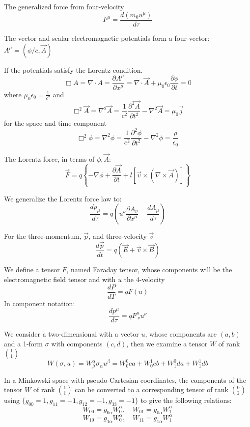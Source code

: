 \documentclass{article}
\begin{document}
    \subsection*{}
    The generalized force from four-velocity
    $$ F^\mu = \frac{d(m_0 u^\mu)}{d\tau} $$
    
    The vector and scalar electromagnetic potentials form a four-vector: $A^\mu = (\phi/c, \vec{A})$
    
    If the potentials satisfy the Lorentz condition.
    $$ \Box A = \nabla \cdot A = \frac{\partial A^\mu}{\partial x^\mu} = \nabla \cdot \vec{A} + \mu_0 \epsilon_0 \frac{\partial \phi}{\partial t} = 0 $$
    where $\mu_0 \epsilon_0 = \frac{1}{c^2}$ and
    $$ \Box^2 \vec{A} = \nabla^2 \vec{A} = \frac{1}{c^2} \frac{\partial^2 \vec{A}}{\partial t^2} - \nabla^2 \vec{A} = \mu_0 \vec{j} $$
    for the space and time component
    $$ \Box^2 \phi = \nabla^2 \phi = \frac{1}{c^2} \frac{\partial^2 \phi}{\partial t^2} - \nabla^2 \phi = \frac{\rho}{\epsilon_0} $$
    
    The Lorentz force, in terms of $\phi, \vec{A}$:
    $$ \vec{F} = q \left\{ -\nabla \phi + \frac{\partial \vec{A}}{\partial t} + l \left[ \vec{v} \times (\nabla \times \vec{A}) \right] \right\} $$
    
    We generalize the Lorentz force law to:
    $$ \frac{dp_\mu}{d\tau} = q \left( u^\nu \frac{\partial A_\nu}{\partial x^\mu} - \frac{dA_\mu}{d\tau} \right) $$
    
    For the three-momentum, $\vec{p}$, and three-velocity $\vec{v}$
    $$ \frac{d\vec{p}}{dt} = q(\vec{E} + \vec{v} \times \vec{B}) $$
    
    We define a tensor $F$, named Faraday tensor, whose components will be the electromagnetic field tensor and with $u$ the 4-velocity
    $$ \frac{dP}{dT} = q F(u) $$
    In component notation:
    $$ \frac{dp^\mu}{d\tau} = q F^\mu_{\ \nu} u^\nu $$
    
    We consider a two-dimensional with a vector $u$, whose components are $(a,b)$ and a 1-form $\sigma$ with components $(c,d)$, then we examine a tensor $W$ of rank $\binom{1}{1}$
    $$ W(\sigma, u) = W^\alpha_\beta \sigma_\alpha u^\beta = W^0_0 c a + W^1_0 c b + W^0_1 d a + W^1_1 d b $$
    
    In a Minkowski space with pseudo-Cartesian coordinates, the components of the tensor $W$ of rank $\binom{1}{1}$ can be converted to a corresponding tensor of rank $\binom{0}{2}$ using $\{g_{00}=1, g_{11}=-1, g_{12}=-1, g_{33}=-1\}$ to give the following relations:
    $$ W_{00} = g_{0\alpha} W^\alpha_0, \quad W_{01} = g_{0\alpha} W^\alpha_1 $$
    $$ W_{10} = g_{1\alpha} W^\alpha_0, \quad W_{11} = g_{1\alpha} W^\alpha_1 $$
    
\end{document}
